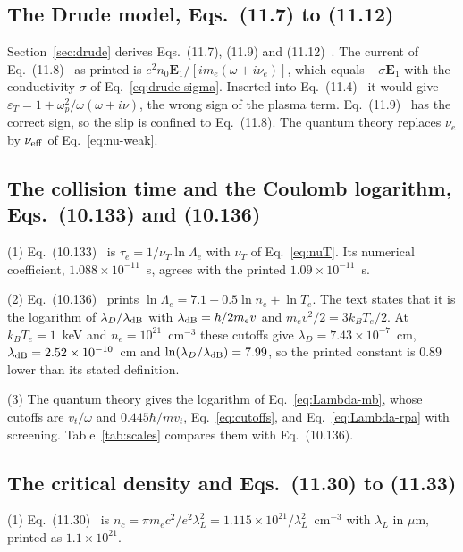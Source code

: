 \documentclass[11pt]{article}
\numberwithin{equation}{section}
\newcommand{\Ev}{\mathbf E}
\newcommand{\nuT}{\nu_T}
\newcommand{\nueff}{\nu_{\rm eff}}
\newcommand{\kB}{k_B}
\begin{document}
\subsection{The Drude model, Eqs.~(11.7) to (11.12)}
Section~\ref{sec:drude} derives Eqs.~(11.7), (11.9) and (11.12)~\cite{Atzeni2004}.
The current of Eq.~(11.8)~\cite{Atzeni2004} as printed is
$e^2n_0\Ev_1/[im_e(\omega+i\nu_e)]$, which equals $-\sigma\Ev_1$ with the
conductivity $\sigma$ of Eq.~\eqref{eq:drude-sigma}. Inserted into
Eq.~(11.4)~\cite{Atzeni2004} it would give $\varepsilon_T=1+\omega_p^2/\omega(\omega+i\nu)$,
the wrong sign of the plasma term. Eq.~(11.9)~\cite{Atzeni2004} has the
correct sign, so the slip is confined to Eq.~(11.8). The quantum theory
replaces $\nu_e$ by $\nueff$ of Eq.~\eqref{eq:nu-weak}.

\subsection{The collision time and the Coulomb logarithm, Eqs.~(10.133) and (10.136)}
\label{app:atzeni-log}
{\noindent}(1) Eq.~(10.133)~\cite{Atzeni2004} is $\tau_e=1/\nuT\ln\Lambda_e$ with
$\nuT$ of Eq.~\eqref{eq:nuT}. Its numerical coefficient,
$1.088\times10^{-11}$~s, agrees with the printed $1.09\times10^{-11}$~s.

{\noindent}(2) Eq.~(10.136)~\cite{Atzeni2004} prints
$\ln\Lambda_e=7.1-0.5\ln n_e+\ln T_e$. The text states that it is the
logarithm of $\lambda_D/\lambda_{\rm dB}$ with $\lambda_{\rm dB}=\hbar/2m_ev$ and
$m_ev^2/2=3\kB T_e/2$. At $\kB T_e=1$~keV and $n_e=10^{21}$~cm$^{-3}$ these
cutoffs give $\lambda_D=7.43\times10^{-7}$~cm, $\lambda_{\rm dB}=2.52\times10^{-10}$~cm and
$\ln(\lambda_D/\lambda_{\rm dB})=7.99$, so the printed constant is $0.89$ lower
than its stated definition.

{\noindent}(3) The quantum theory gives the logarithm of
Eq.~\eqref{eq:Lambda-mb}, whose cutoffs are $v_t/\omega$ and
$0.445\hbar/mv_t$, Eq.~\eqref{eq:cutoffs}, and Eq.~\eqref{eq:Lambda-rpa} with
screening. Table~\ref{tab:scales} compares them with Eq.~(10.136).

\subsection{The critical density and Eqs.~(11.30) to (11.33)}
{\noindent}(1) Eq.~(11.30)~\cite{Atzeni2004} is $n_c=\pi m_ec^2/e^2\lambda_L^2=1.115\times10^{21}/\lambda_L^2$~cm$^{-3}$
with $\lambda_L$ in $\mu$m, printed as $1.1\times10^{21}$.
\end{document}
